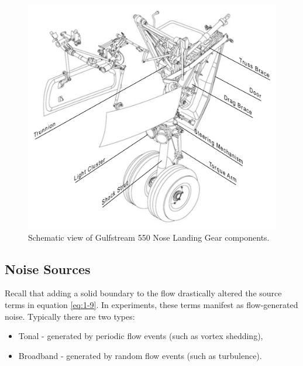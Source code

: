 \begin{figure}
	\begin{center}
		\centerline{\includegraphics[scale=0.7]{figures/lg_schematic.pdf}}
		\caption{Schematic view of Gulfstream 550 Nose Landing Gear components.}
		\label{fig:lg2}
	\end{center}
\end{figure}


\subsection{Noise Sources}
Recall that adding a solid boundary to the flow drastically altered the source terms in equation \ref{eq:1-9}. In experiments, these terms manifest as flow-generated noise. Typically there are two types: 

\begin{itemize}  
        \item Tonal - generated by periodic flow events (such as vortex shedding),
        \item Broadband - generated by random flow events (such as turbulence). 
\end{itemize}
    

